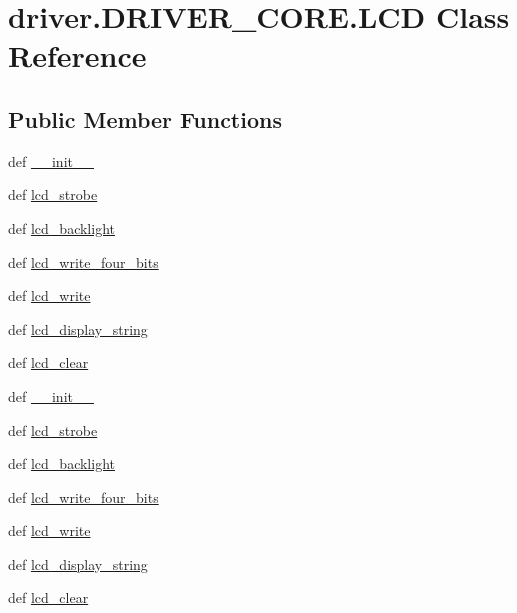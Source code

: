 \hypertarget{classdriver_1_1DRIVER__CORE_1_1LCD}{}\section{driver.\+D\+R\+I\+V\+E\+R\+\_\+\+C\+O\+R\+E.\+L\+C\+D Class Reference}
\label{classdriver_1_1DRIVER__CORE_1_1LCD}
\subsection*{Public Member Functions}
\begin{DoxyCompactItemize}
\item 
def \hyperlink{classdriver_1_1DRIVER__CORE_1_1LCD_a42d8dfae2030675de36c798311a4c081}{\+\_\+\+\_\+init\+\_\+\+\_\+}
\item 
def \hyperlink{classdriver_1_1DRIVER__CORE_1_1LCD_adb4ade1f425d0a6e2381d0867ee1b28e}{lcd\+\_\+strobe}
\item 
def \hyperlink{classdriver_1_1DRIVER__CORE_1_1LCD_a8e3c81f32062f6696ab645b4c3b5ef04}{lcd\+\_\+backlight}
\item 
def \hyperlink{classdriver_1_1DRIVER__CORE_1_1LCD_a68e940af4dc6aa7e973d87b4f2aab36e}{lcd\+\_\+write\+\_\+four\+\_\+bits}
\item 
def \hyperlink{classdriver_1_1DRIVER__CORE_1_1LCD_ab58cedfbef364410e3eb958a2af041fd}{lcd\+\_\+write}
\item 
def \hyperlink{classdriver_1_1DRIVER__CORE_1_1LCD_a164b4819a2e592ae683f4db5902d88f2}{lcd\+\_\+display\+\_\+string}
\item 
def \hyperlink{classdriver_1_1DRIVER__CORE_1_1LCD_a3242b603d9dd21803d4283e714d76c1e}{lcd\+\_\+clear}
\item 
def \hyperlink{classdriver_1_1DRIVER__CORE_1_1LCD_a42d8dfae2030675de36c798311a4c081}{\+\_\+\+\_\+init\+\_\+\+\_\+}
\item 
def \hyperlink{classdriver_1_1DRIVER__CORE_1_1LCD_adb4ade1f425d0a6e2381d0867ee1b28e}{lcd\+\_\+strobe}
\item 
def \hyperlink{classdriver_1_1DRIVER__CORE_1_1LCD_a8e3c81f32062f6696ab645b4c3b5ef04}{lcd\+\_\+backlight}
\item 
def \hyperlink{classdriver_1_1DRIVER__CORE_1_1LCD_a68e940af4dc6aa7e973d87b4f2aab36e}{lcd\+\_\+write\+\_\+four\+\_\+bits}
\item 
def \hyperlink{classdriver_1_1DRIVER__CORE_1_1LCD_ab58cedfbef364410e3eb958a2af041fd}{lcd\+\_\+write}
\item 
def \hyperlink{classdriver_1_1DRIVER__CORE_1_1LCD_a164b4819a2e592ae683f4db5902d88f2}{lcd\+\_\+display\+\_\+string}
\item 
def \hyperlink{classdriver_1_1DRIVER__CORE_1_1LCD_a3242b603d9dd21803d4283e714d76c1e}{lcd\+\_\+clear}
\end{DoxyCompactItemize}
